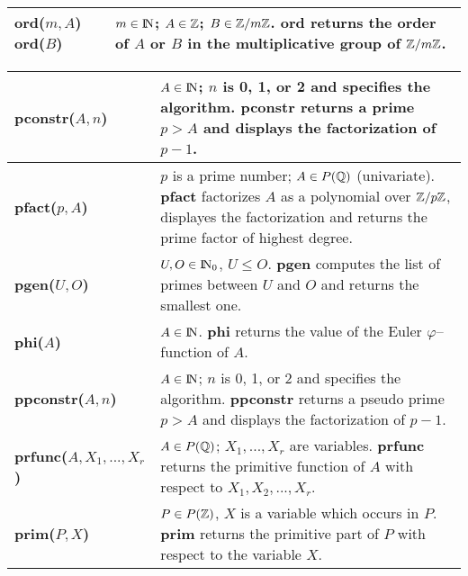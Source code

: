 {\begin{tabular}{|p{1.95in}|p{3.83in}|}
{\bf ord($m,A$)} \newline
{\bf ord($B$)} &
$m\in {\rm{I\!N}}$; $A\in \mbox{$\mathbb Z$}$; $B\in \mbox{$\mathbb Z$}/m\mbox{$\mathbb Z$}$.\newline
{\bf ord} returns the order of $A$ or $B$ in the multiplicative group
of $\mbox{$\mathbb Z$}/m\mbox{$\mathbb Z$}$.\\ \hline
\end{tabular}

\newpage

\begin{tabular}{|p{1.95in}|p{3.83in}|} \hline

{\bf pconstr($A, n$)} &
$A \in {\rm{I\!N}}$; $n$ is 0, 1, or 2 and specifies the algorithm.\newline
{\bf pconstr} returns a prime $p > A$ and displays the fac\-to\-ri\-za\-tion of
$p - 1$.\\ \hline

{\bf pfact($p,A$)} &
$p$ is a prime number; $A \in P(\mbox{$\mathbb Q$})$ (univariate).\newline
{\bf pfact} factorizes $A$ as a polynomial over $\mbox{$\mathbb Z$}/p\mbox{$\mathbb Z$}$, displayes the factorization and returns the prime
factor of highest degree.\\ \hline

{\bf pgen($U,O$)} &
$U,O \in {\rm{I\!N}}_0$, $U \leq O$.\newline
{\bf pgen} computes the list of primes between $U$ and $O$ and returns the
smallest one.\\ \hline

{\bf phi($A$)} &
$A \in {\rm{I\!N}}$.\newline
{\bf phi} returns the value of the Euler $\varphi$--function of $A$.\\ \hline

{\bf ppconstr($A, n$)} &
$A \in {\rm{I\!N}}$; $n$ is 0, 1, or 2 and specifies the algorithm.\newline
{\bf ppconstr} returns a pseudo prime $p > A$ and displays the 
factorization of
$p - 1$.\\ \hline

{\bf prfunc($A,X_1, ..., X_r$)} &
$A \in P(\mbox{$\mathbb Q$})$; $X_1,...,X_r$ are variables.\newline
{\bf prfunc} returns the primitive function of $A$ with respect to
$X_1,X_2,...,X_r$.\\ \hline

{\bf prim($P,X$)} &
$P \in P(\mbox{$\mathbb Z$})$, $X$ is a variable which occurs in $P$.\newline
{\bf prim} returns the primitive part of $P$ with respect to the variable 
$X$.\\ \hline


\end{tabular}}
